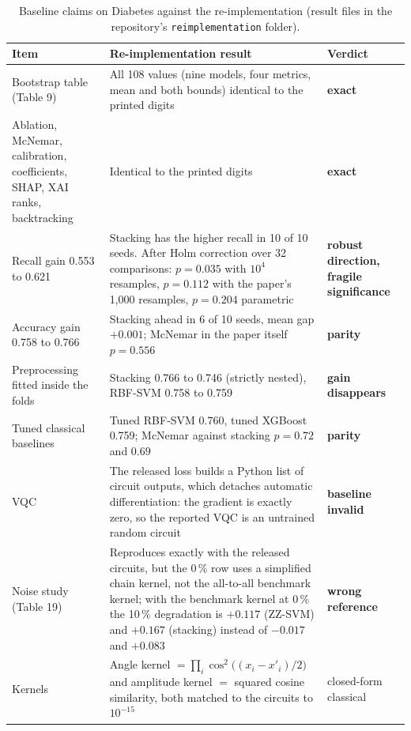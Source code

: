 \documentclass[11pt,a4paper]{article}
\newcommand{\OK}[1]{\textcolor{ok}{\textbf{#1}}}
\newcommand{\WARN}[1]{\textcolor{warn}{\textbf{#1}}}
\newcommand{\BAD}[1]{\textcolor{bad}{\textbf{#1}}}
\newcommand{\code}[1]{\texttt{\small #1}}
\begin{document}
\begin{table}[H]
\centering\footnotesize
\caption{Baseline claims on Diabetes against the re-implementation (result files in the repository's \code{reimplementation} folder).}
\label{tab:reimpl}
\begin{tabularx}{\textwidth}{L{4.0cm} Y L{2.4cm}}
\toprule
Item & Re-implementation result & Verdict \\
\midrule
Bootstrap table (Table 9) & All 108 values (nine models, four metrics, mean and both bounds) identical to the printed digits & \OK{exact} \\
Ablation, McNemar, calibration, coefficients, SHAP, XAI ranks, backtracking & Identical to the printed digits & \OK{exact} \\
Recall gain 0.553 to 0.621 & Stacking has the higher recall in 10 of 10 seeds. After Holm correction over 32 comparisons: $p=0.035$ with $10^4$ resamples, $p=0.112$ with the paper's 1,000 resamples, $p=0.204$ parametric & \WARN{robust direction, fragile significance} \\
Accuracy gain 0.758 to 0.766 & Stacking ahead in 6 of 10 seeds, mean gap $+0.001$; McNemar in the paper itself $p=0.556$ & \WARN{parity} \\
Preprocessing fitted inside the folds & Stacking 0.766 to 0.746 (strictly nested), RBF-SVM 0.758 to 0.759 & \BAD{gain disappears} \\
Tuned classical baselines & Tuned RBF-SVM 0.760, tuned XGBoost 0.759; McNemar against stacking $p=0.72$ and $0.69$ & \WARN{parity} \\
VQC & The released loss builds a Python list of circuit outputs, which detaches automatic differentiation: the gradient is exactly zero, so the reported VQC is an untrained random circuit & \BAD{baseline invalid} \\
Noise study (Table 19) & Reproduces exactly with the released circuits, but the 0\,\% row uses a simplified chain kernel, not the all-to-all benchmark kernel; with the benchmark kernel at 0\,\% the 10\,\% degradation is $+0.117$ (ZZ-SVM) and $+0.167$ (stacking) instead of $-0.017$ and $+0.083$ & \BAD{wrong reference} \\
Kernels & Angle kernel $=\prod_i\cos^2\!\big((x_i-x'_i)/2\big)$ and amplitude kernel $=$ squared cosine similarity, both matched to the circuits to $10^{-15}$ & closed-form classical \\
\bottomrule
\end{tabularx}
\end{table}
\end{document}
